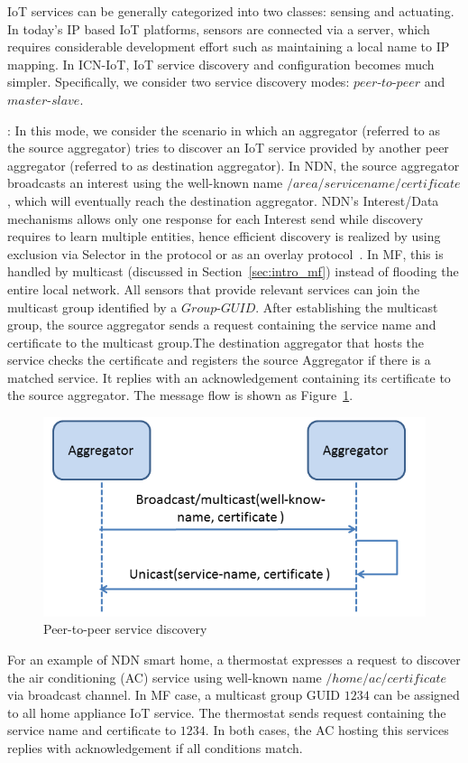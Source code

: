 IoT services can be generally categorized into two classes: sensing and actuating. In today's IP based IoT platforms, sensors are connected via a server, which requires considerable development effort such as maintaining a local name to IP mapping. In ICN-IoT, IoT service discovery and configuration becomes much simpler. Specifically, we consider two service discovery modes: $peer$-$to$-$peer$ and $master$-$slave$.


\vspace{1mm}: In this mode, we consider the scenario in which an aggregator (referred to as the source aggregator) tries to discover an IoT service provided by another peer aggregator (referred to as destination aggregator). In NDN, the source aggregator broadcasts an interest using the well-known name $/area/servicename/certificate$, which will eventually reach the destination aggregator. NDN's Interest/Data mechanisms allows only one response for each Interest send while discovery requires to learn multiple entities, hence efficient discovery is realized by using exclusion via Selector in the protocol or as an overlay protocol~\cite{ravindran2013information}. In MF, this is handled by multicast (discussed in Section~\ref{sec:intro_mf}) instead of flooding the entire local network. All sensors that provide relevant services can join the multicast group identified by a $Group$-$GUID$. After establishing the multicast group, the source aggregator sends a request containing the service name and certificate to the multicast group.The destination aggregator that hosts the service checks the certificate and registers the source Aggregator if there is a matched service. It replies with an acknowledgement containing its certificate to the source aggregator. The message flow is shown as Figure~\ref{fig:ser_dis}.
\begin{figure}
\includegraphics[width=\columnwidth]{figure/service_discovery.png}
\caption{\label{fig:ser_dis}Peer-to-peer service discovery}
\end{figure}
For an example of NDN smart home, a thermostat expresses a request to discover the air conditioning (AC) service using well-known name $/home/ac/certificate$ via broadcast channel. In MF case, a multicast group GUID $1234$ can be assigned to all home appliance IoT service. The thermostat sends request containing the service name and certificate to $1234$. In both cases, the AC hosting this services replies with acknowledgement if all conditions match.

